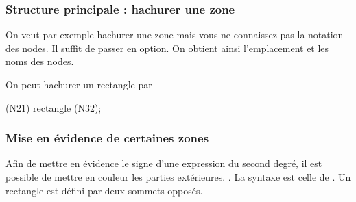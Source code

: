 \begin{tkzexample}[small]
\end{tkzexample}

\subsubsection{Structure principale : hachurer une zone}

On veut par exemple hachurer une zone mais vous ne connaissez pas la notation des nodes. Il suffit de passer  en option. On obtient ainsi l'emplacement et les noms des nodes.

\begin{tkzexample}
\end{tkzexample}


\medskip
On peut  hachurer un rectangle par

    \begin{tkzexample}
    \pattern[pattern=north west lines] (N21) rectangle (N32);
    \end{tkzexample}


\begin{tkzexample}[small]
\end{tkzexample}



\subsubsection{Mise en évidence de certaines zones}

Afin de mettre en évidence le signe d'une expression du second degré, il est possible de mettre en couleur les parties extérieures. . La syntaxe est celle de \TIKZ. Un rectangle est défini par deux sommets opposés.

